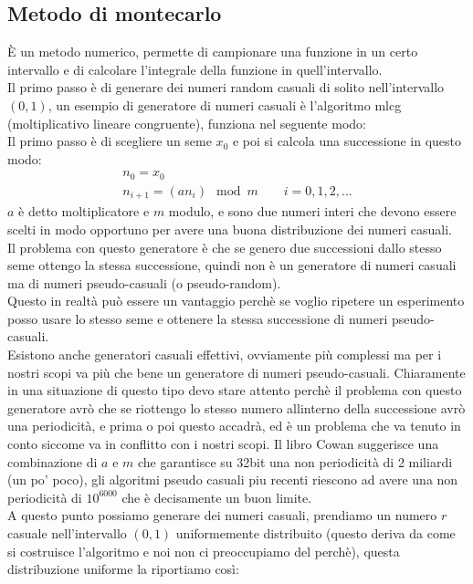 \documentclass[a4paper, oneside]{article}
\begin{document}
\subsection{Metodo di montecarlo}
È un metodo numerico, permette di campionare una funzione in un certo intervallo e di calcolare l'integrale della funzione in quell'intervallo.\\
Il primo passo è di generare dei numeri random casuali di solito nell'intervallo $(0,1)$, un esempio di generatore di numeri casuali è l'algoritmo mlcg (moltiplicativo lineare congruente), 
funziona nel seguente modo:\\
Il primo passo è di scegliere un seme $x_0$ e poi si calcola una successione in questo modo:
\begin{gather*}
    n_0 = x_0 \\
    n_{i+1} = (a n_i) \mod m \qquad i = 0,1,2,\dots
\end{gather*}
$a$ è detto moltiplicatore e $m$ modulo, e sono due numeri interi che devono essere scelti in modo opportuno per avere una buona distribuzione dei numeri casuali.\\
Il problema con questo generatore è che se genero due successioni dallo stesso seme ottengo la stessa successione, quindi non è un generatore di numeri casuali ma di numeri pseudo-casuali (o pseudo-random).\\
Questo in realtà può essere un vantaggio perchè se voglio ripetere un esperimento posso usare lo stesso seme e ottenere la stessa successione di numeri pseudo-casuali.\\
Esistono anche generatori casuali effettivi, ovviamente più complessi ma per i nostri scopi va più che bene un generatore di numeri pseudo-casuali. Chiaramente in una situazione di questo tipo devo stare attento perchè il problema con questo generatore avrò che se riottengo lo stesso numero allinterno della successione avrò una periodicità, e prima o poi questo accadrà, ed è un problema che va tenuto in conto siccome va in conflitto con i nostri scopi. Il libro Cowan suggerisce una combinazione di $a$ e $m$ che garantisce su 32bit una non periodicità di 2 miliardi (un po' poco), gli algoritmi pseudo casuali piu recenti riescono ad avere una non periodicità di $10^{6000}$ che è decisamente un buon limite.\\
A questo punto possiamo generare dei numeri casuali, prendiamo un numero $r$ casuale nell'intervallo $(0,1)$ uniformemente distribuito (questo deriva da come si costruisce l'algoritmo e noi non ci preoccupiamo del perchè), questa distribuzione uniforme la riportiamo così:
\end{document}
